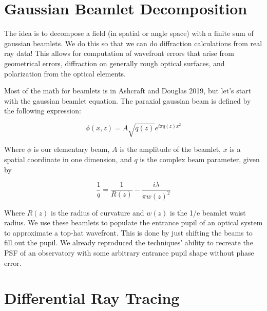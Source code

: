 \documentclass{article}
\begin{document}
	\section{Gaussian Beamlet Decomposition}
	
	The idea is to decompose a field (in spatial or angle space) with a finite sum of gaussian beamlets. We do this so that we can do diffraction calculations from real ray data! This allows for computation of wavefront errors that arise from geometrical errors, diffraction on generally rough optical surfaces, and polarization from the optical elements.
	
	Most of the math for beamlets is in Ashcraft and Douglas 2019, but let's start with the gaussian beamlet equation. The paraxial gaussian beam is defined by the following expression: 
	
	\begin{equation}
		\phi(x,z) = A\sqrt{q(z)}e^{i\pi q(z)x^{2}}
	\end{equation}
	
	Where $\phi$ is our elementary beam, $A$ is the amplitude of the beamlet, $x$ is a spatial coordinate in one dimension, and $q$ is the complex beam parameter, given by
	
	\begin{equation}
		\frac{1}{q} = \frac{1}{R(z)} - \frac{i\lambda}{\pi w(z)^{2}}
	\end{equation}
	
	Where $R(z)$ is the radius of curvature and $w(z)$ is the 1/e beamlet waist radius. We use these beamlets to populate the entrance pupil of an optical system to approximate a top-hat wavefront. This is done by just shifting the beams to fill out the pupil. We already reproduced the techniques' ability to recreate the PSF of an observatory with some arbitrary entrance pupil shape without phase error.
	
	\section{Differential Ray Tracing}
	
\end{document}
